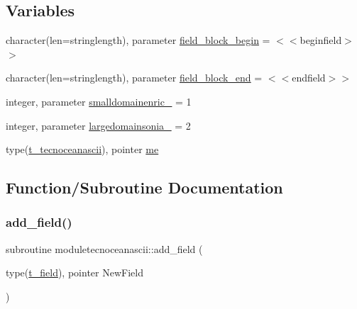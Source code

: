 \subsection*{Variables}
\begin{DoxyCompactItemize}
\item 
character(len=stringlength), parameter \mbox{\hyperlink{namespacemoduletecnoceanascii_a6e203357bcc95a95fdbd379800fe67d3}{field\+\_\+block\+\_\+begin}} = \textquotesingle{}$<$$<$beginfield$>$$>$\textquotesingle{}
\item 
character(len=stringlength), parameter \mbox{\hyperlink{namespacemoduletecnoceanascii_ae09b9d3c02199141bcdb650b675af2ad}{field\+\_\+block\+\_\+end}} = \textquotesingle{}$<$$<$endfield$>$$>$\textquotesingle{}
\item 
integer, parameter \mbox{\hyperlink{namespacemoduletecnoceanascii_a6fe13b67d048df63df18928a818d2859}{smalldomainenric\+\_\+}} = 1
\item 
integer, parameter \mbox{\hyperlink{namespacemoduletecnoceanascii_a4ffd05d8c1e9d8c2e16164dfcb819fa2}{largedomainsonia\+\_\+}} = 2
\item 
type(\mbox{\hyperlink{structmoduletecnoceanascii_1_1t__tecnoceanascii}{t\+\_\+tecnoceanascii}}), pointer \mbox{\hyperlink{namespacemoduletecnoceanascii_aee18ab90005a90ec638a6d2f9cb614f6}{me}}
\end{DoxyCompactItemize}


\subsection{Function/\+Subroutine Documentation}
\mbox{\label{namespacemoduletecnoceanascii_a3b498ef686c47e5dae7627d7045ed16a}} 
\subsubsection{\texorpdfstring{add\+\_\+field()}{add\_field()}}
{\footnotesize\ttfamily subroutine moduletecnoceanascii\+::add\+\_\+field (\begin{DoxyParamCaption}\item[{type(\mbox{\hyperlink{structmoduletecnoceanascii_1_1t__field}{t\+\_\+field}}), pointer}]{New\+Field }\end{DoxyParamCaption})\hspace{0.3cm}{\ttfamily [private]}}

